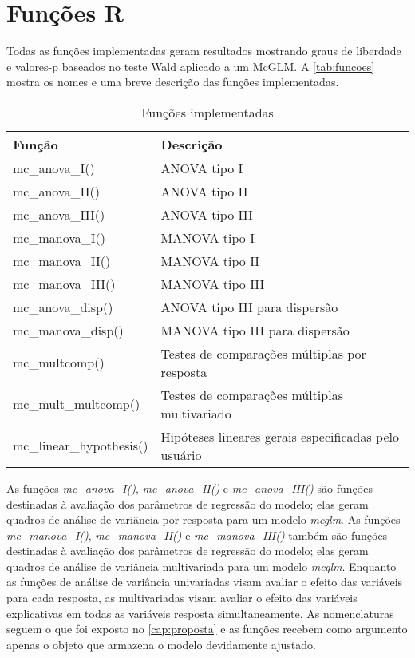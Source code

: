 \section{Funções R}

Todas as funções implementadas geram resultados mostrando graus de liberdade e valores-p baseados no teste Wald aplicado a um McGLM. A \autoref{tab:funcoes} mostra os nomes e uma breve descrição das funções implementadas.

\begin{table}[h]
\centering
\begin{tabular}{ll}
\hline
Função                   & Descrição \\ 
\hline

mc\_anova\_I()           & ANOVA  tipo I \\
mc\_anova\_II()          & ANOVA  tipo II \\
mc\_anova\_III()         & ANOVA  tipo III \\

mc\_manova\_I()          & MANOVA tipo I \\
mc\_manova\_II()         & MANOVA tipo II \\
mc\_manova\_III()        & MANOVA tipo III \\

mc\_anova\_disp()        & ANOVA  tipo III para dispersão \\
mc\_manova\_disp()       & MANOVA tipo III para dispersão \\

mc\_multcomp()           & Testes de comparações múltiplas por resposta \\

mc\_mult\_multcomp()     & Testes de comparações múltiplas multivariado \\

mc\_linear\_hypothesis() & Hipóteses lineares gerais especificadas pelo usuário \\

\hline
\end{tabular}
\caption{Funções implementadas}
\label{tab:funcoes}
\end{table}

As funções \emph{mc\_anova\_I()}, \emph{mc\_anova\_II()} e \emph{mc\_anova\_III()} são funções destinadas à avaliação dos parâmetros de regressão do modelo; elas geram quadros de análise de variância por resposta para um modelo \emph{mcglm}. As funções \emph{mc\_manova\_I()}, \emph{mc\_manova\_II()} e \emph{mc\_manova\_III()} também são funções destinadas à avaliação dos parâmetros de regressão do modelo; elas geram quadros de análise de variância multivariada para um modelo \emph{mcglm}. Enquanto as funções de análise de variância univariadas visam avaliar o efeito das variáveis para cada resposta, as multivariadas visam avaliar o efeito das variáveis explicativas em todas as variáveis resposta simultaneamente. As nomenclaturas seguem o que foi exposto no \autoref{cap:proposta} e as funções recebem como argumento apenas o objeto que armazena o modelo devidamente ajustado.

